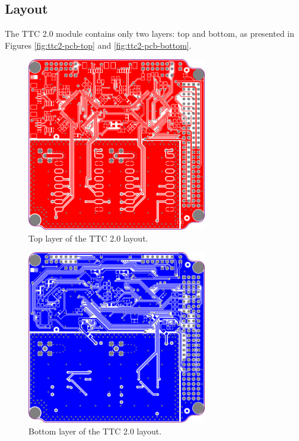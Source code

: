 \subsection{Layout}

The TTC 2.0 module contains only two layers: top and bottom, as presented in Figures \ref{fig:ttc2-pcb-top} and \ref{fig:ttc2-pcb-bottom}.

\begin{figure}[!ht]
    \begin{center}
        \includegraphics[width=0.7\textwidth]{figures/ttc2-layout-top.png}
        \caption{Top layer of the TTC 2.0 layout.}
        \label{fig:ttc2-layout-top}
    \end{center}
\end{figure}

\begin{figure}[!ht]
    \begin{center}
        \includegraphics[width=0.7\textwidth]{figures/ttc2-layout-bottom.png}
        \caption{Bottom layer of the TTC 2.0 layout.}
        \label{fig:ttc2-layout-bottom}
    \end{center}
\end{figure}

